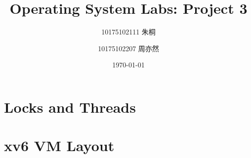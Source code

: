 \documentclass[a4paper,11pt,UTF8]{article}
\title{Operating System Labs: Project 3}
\author{10175102111 \quad 朱桐 \and 10175102207 \quad 周亦然}
\date{\today}
\numberwithin{equation}{section}
\numberwithin{figure}{section}
\begin{document}
\maketitle

\renewcommand\thesection{\alph{section}}

\tableofcontents

\clearpage

\section{Locks and Threads}



\clearpage

\section{xv6 VM Layout}


\end{document}

